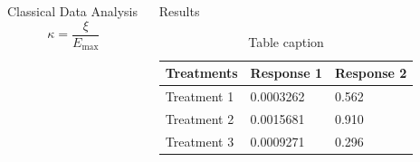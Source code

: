 \documentclass[final]{beamer}
\newlength{\sepwid}
\newlength{\onecolwid}
\newlength{\twocolwid}
\begin{document}
\begin{frame}[t]
\begin{columns}[t]
\begin{column}{\twocolwid}
\begin{columns}[t,totalwidth=\twocolwid]
\begin{column}{\onecolwid}
\begin{block}{Classical Data Analysis}
\begin{equation}
\kappa =\frac{\xi}{E_{\mathrm{max}}} %
\end{equation}

\end{block}


\end{column} %

\begin{column}{\onecolwid} %


\begin{block}{Results}

\begin{table}
\vspace{2ex}
\begin{tabular}{l l l}
\toprule
\textbf{Treatments} & \textbf{Response 1} & \textbf{Response 2}\\
\midrule
Treatment 1 & 0.0003262 & 0.562 \\
Treatment 2 & 0.0015681 & 0.910 \\
Treatment 3 & 0.0009271 & 0.296 \\
\bottomrule
\end{tabular}
\caption{Table caption}
\end{table}

\end{block}


\end{column} %

\end{columns} %

\end{column} %

\begin{column}{\sepwid}\end{column} %

\begin{column}{\onecolwid} %


\end{column}
\end{columns}
\end{frame}
\end{document}
